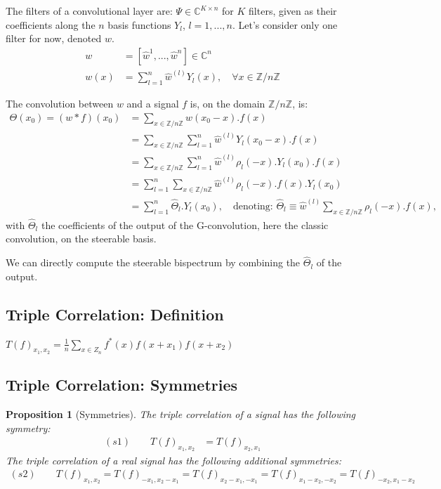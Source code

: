 \documentclass{article}
\newtheorem{proposition}{Proposition}
\begin{document}
The filters of a convolutional layer are: $\Psi \in \mathbb{C}^{K \times n}$ for $K$ filters, given as their coefficients along the $n$ basis functions $Y_l$, $l=1, ..., n$. Let's consider only one filter for now, denoted $w$.
\begin{align*}
    w
    &= [\hat{w}^{1}, ..., \hat{w}^{n}] \in \mathbb{C}^n \\
    w(x)
    &= \sum_{l=1}^n \hat{w}^{(l)}Y_l(x), \quad \forall x \in \mathbb{Z} / n\mathbb{Z}
\end{align*}

The convolution between $w$ and a signal $f$ is, on the domain $\mathbb{Z} / n \mathbb{Z}$, is:
\begin{align*}
    \Theta(x_0) = (w \ast f) (x_0)
    &= \sum_{x \in \mathbb{Z}/n\mathbb{Z}} w(x_0-x).f(x) \\
    &= \sum_{x \in \mathbb{Z}/n\mathbb{Z}} \sum_{l=1}^n  \hat{w}^{(l)}Y_l(x_0-x).f(x) \\
    &= \sum_{x \in \mathbb{Z}/n\mathbb{Z}} \sum_{l=1}^n  \hat{w}^{(l)}\rho_l(-x). Y_l(x_0).f(x) \\
    &=\sum_{l=1}^n  \sum_{x \in \mathbb{Z}/n\mathbb{Z}} \hat{w}^{(l)}\rho_l(-x).f(x).Y_l(x_0) \\
    &=\sum_{l=1}^n \hat{\Theta}_l .Y_l(x_0),
    \quad \text{denoting:~} \hat{\Theta}_l \equiv \hat{w}^{(l)} \sum_{x \in \mathbb{Z}/n\mathbb{Z}} \rho_l(-x).f(x),
\end{align*}
with $\hat{\Theta}_l$ the coefficients of the output of the G-convolution, here the classic convolution, on the steerable basis.

We can directly compute the steerable bispectrum by combining the $\hat{\Theta}_l$ of the output.


\subsection{Triple Correlation: Definition}

$T(f)_{x_1, x_2} = \frac{1}{n} \sum_{x \in Z_n}f^*(x)f(x+x_1)f(x+x_2)$

\subsection{Triple Correlation: Symmetries}

\begin{proposition}[Symmetries]
The triple correlation of a signal has the following symmetry:
\begin{align*}
     (s1) \qquad T(f)_{x_1, x_2} &= T(f)_{x_2, x_1}
\end{align*}
The triple correlation of a real signal has the following additional symmetries:
\begin{align*}
     (s2) \qquad T(f)_{x_1, x_2} = T(f)_{-x_1, x_2-x_1} = T(f)_{x_2-x_1, -x_1} = T(f)_{x_1-x_2, -x_2} = T(f)_{-x_2, x_1-x_2}
\end{align*}
\end{proposition}
\end{document}
